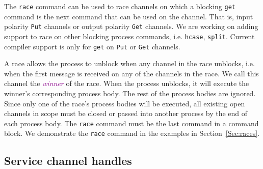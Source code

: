 \documentclass[acmsmall]{acmart}
\newcommand{\tc}[1]{\textcolor{darkMagenta}{\textit{#1}}}
\begin{document}
The \lstinline$race$ command can be used to race channels on which a blocking \lstinline$get$ command is the next command that can be used on the channel.
That is, input polarity \lstinline$Put$ channels or output polarity \lstinline$Get$ channels.
We are working on adding support to race on other blocking process commands, i.e. \lstinline$hcase$, \lstinline$split$. Current compiler support is only for \lstinline$get$ on \lstinline$Put$ or \lstinline$Get$ channels.

A race allows the process to unblock when any channel in the race unblocks, i.e. when the first message is received on any of the channels in the race.
We call this channel the \tc{winner} of the race.
When the process unblocks, it will execute the winner's corresponding process body.
The rest of the process bodies are ignored.
Since only one of the race's process bodies will be executed, all existing open channels in scope must be closed or passed into another process by the end of each process body.
The \lstinline$race$ command must be the last command in a command block.
We demonstrate the \lstinline$race$ command in the examples in Section~\ref{Sec:races}.



\subsection{Service channel handles}
\label{sec:servicehandles}
\end{document}
